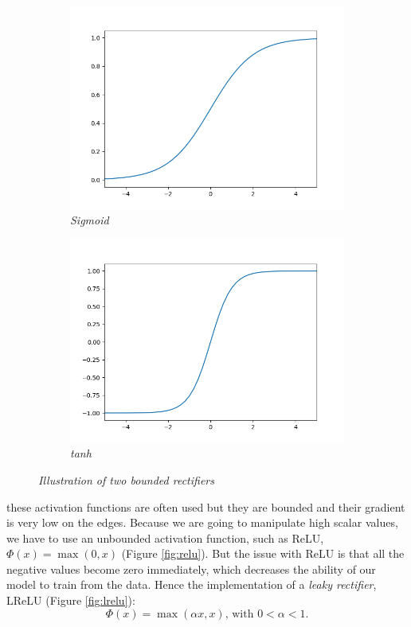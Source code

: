 \documentclass{article}
\begin{document}
            \begin{figure}[!ht]
                \begin{subfigure}{.49\linewidth}
                    \centering
                    \includegraphics[width=.9\linewidth]{pics/act-sigmoid.png}
                    \caption{\textit{Sigmoid}}
                \end{subfigure}
                \begin{subfigure}{.49\linewidth}
                    \centering
                    \includegraphics[width=.9\linewidth]{pics/act-tanh.png}
                    \caption{\textit{tanh}}
                \end{subfigure}
                \caption{\textit{Illustration of two bounded rectifiers}}
                \label{fig:act-sigmoids}
            \end{figure}

            these activation functions are often used but they are bounded and their gradient is very low on the edges. Because we are going to manipulate high scalar values, we have to use an unbounded activation function, such as ReLU, $\Phi(x)=\max(0,x)$ (Figure \ref{fig:relu}). But the issue with ReLU is that all the negative values become zero immediately, which decreases the ability of our model to train from the data. Hence the implementation of a \textit{leaky rectifier}, LReLU (Figure \ref{fig:lrelu}):
            $$\Phi(x)=\max(\alpha x,x)\mbox{, with } 0<\alpha<1.$$
\end{document}
